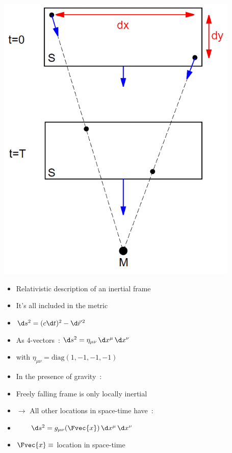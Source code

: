 \newpage

\begin{center}
\includegraphics[keepaspectratio,height=14cm]{equivalence2}
\end{center}

\Tr
{}%
\begin{itemize}
\item Relativistic description of an {\red inertial frame}
\item[] It's all included in the metric
\item[] $\d s^{2}=(c\d t)^{2}-\d\vec{r}^{\,2}$
\item[] As 4-vectors~: {\red $\d s^{2}=\eta_{\mu\nu}\,\d x^{\mu}\,\d x^{\nu}$}
\item[] with $\eta_{\mu\nu}=\text{diag}(1,-1,-1,-1)$
\item In the presence of gravity~:
\item[] Freely falling frame is only locally inertial
\item[] $\rightarrow$ All other locations in space-time have~:
\item[] {\blue $\qquad \d s^{2}=g_{\mu\nu}(\Fvec{x})\,\d x^{\mu}\,\d x^{\nu}$}
\item[] $\Fvec{x} \equiv$ location in space-time
\end{itemize}

